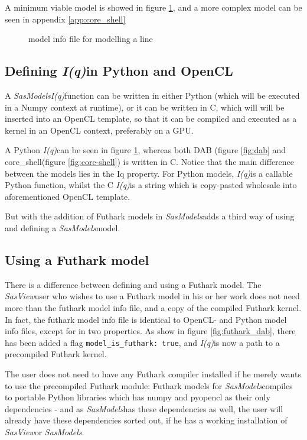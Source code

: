 \documentclass[11pt]{article}
\newcommand{\sasmodels}{\textit{SasModels}}
\newcommand{\sasview}{\textit{SasView}}
\newcommand{\iq}{\textit{I(q)}}
\begin{document}
A minimum viable model is showed in figure \ref{fig:linemodel}, and a more
complex model can be seen in appendix \ref{app:core_shell}

\begin{figure}
  \caption{model info file for modelling a line}\label{fig:linemodel}
\end{figure}

\subsection{Defining \iq in Python and OpenCL}
A \sasmodels \iq function can be written in either Python (which will be
executed in a Numpy context at runtime), or it can be written in C, which will
will be inserted into an OpenCL template, so that it can be compiled and 
executed as a kernel in an OpenCL context, preferably on a GPU.

A Python \iq can be seen in figure \ref{fig:linemodel}, whereas both DAB (figure
\ref{fig:dab} and core\_shell(figure \ref{fig:core-shell}) is written in C.
Notice that the main difference between the models lies in the Iq property.
For Python models, \iq is a callable Python function, whilst the C \iq is a
 string which is copy-pasted wholesale into aforementioned OpenCL template.

But with the addition of Futhark models in \sasmodels adds a third way of
using and defining a \sasmodels model.

\subsection{Using a Futhark model}
\label{sec:using-futhark}
There is a difference between defining and using a Futhark model.
The \sasview user who wishes to use a Futhark model in his or her work does 
not need more than the futhark model info file, and a copy of the compiled
Futhark kernel. In fact, the futhark model info file is identical to OpenCL- 
and Python model info files, except for in two properties.
As show in figure \ref{fig:futhark_dab}, there has been added a flag 
\texttt{model\_is\_futhark: true}, and \iq is now a path to a precompiled 
Futhark kernel.

The user does not need to have any Futhark compiler installed if he merely wants
to use the precompiled Futhark module: Futhark models for \sasmodels compiles to
portable Python libraries which has numpy and pyopencl as their only 
dependencies - and as \sasmodels has these dependencies as well, the user will
already have these dependencies sorted out, if he has a working installation of 
\sasview or \sasmodels.
\end{document}

